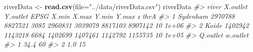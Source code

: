 \documentclass[
]{article}
\newenvironment{Shaded}{\begin{snugshade}}{\end{snugshade}}
\newcommand{\AttributeTok}[1]{\textcolor[rgb]{0.13,0.29,0.53}{#1}}
\newcommand{\CommentTok}[1]{\textcolor[rgb]{0.56,0.35,0.01}{\textit{#1}}}
\newcommand{\FunctionTok}[1]{\textcolor[rgb]{0.13,0.29,0.53}{\textbf{#1}}}
\newcommand{\NormalTok}[1]{#1}
\newcommand{\OtherTok}[1]{\textcolor[rgb]{0.56,0.35,0.01}{#1}}
\newcommand{\StringTok}[1]{\textcolor[rgb]{0.31,0.60,0.02}{#1}}
\begin{document}
\begin{Shaded}
\begin{Highlighting}[]
\NormalTok{riverData }\OtherTok{\textless{}{-}} \FunctionTok{read.csv}\NormalTok{(}\AttributeTok{file=}\StringTok{"../data/riverData.csv"}\NormalTok{) }
\NormalTok{riverData}
\CommentTok{\#\textgreater{}      river X.outlet Y.outlet EPSG   X.min   X.max   Y.min   Y.max  z  thrA}
\CommentTok{\#\textgreater{} 1 Sydenham  2970788  8827521 3085 2960831 3039079 8817103 8907142 10 1e+06}
\CommentTok{\#\textgreater{} 2    Koide  1402942  1143218 6684 1402699 1407461 1142792 1155735 10 1e+05}
\CommentTok{\#\textgreater{}   Q.outlet w.outlet}
\CommentTok{\#\textgreater{} 1     34.4       60}
\CommentTok{\#\textgreater{} 2      1.0       15}
\end{Highlighting}
\end{Shaded}
\end{document}
